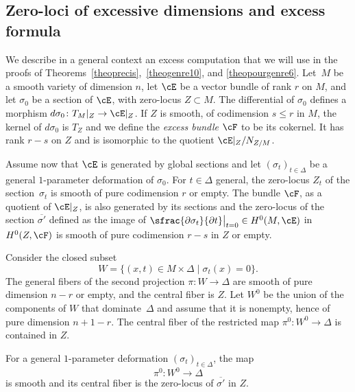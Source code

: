 \subsection{Zero-loci of excessive dimensions and excess formula}\label{secexcess}
We describe in a general context an excess computation that we will use in the
proofs of Theorems~\ref{theoprecis},~\ref{theogenre10}, and \ref{theopourgenre6}.
Let~$M$ be a smooth variety of dimension $n$, let $\cE$ be a vector bundle of rank $r$ on $M$, and let
$\sigma_0$ be a section of $\cE$, with zero-locus $Z\subset M$. The differential of $\sigma_0$ defines a morphism $d\sigma_0\colon T_M\vert_Z\to \cE\vert_{Z}$. If $Z$ is smooth, of codimension $s\le r $ in $M$,
the kernel of $d\sigma_0$ is $T_Z$ and we define the \emph{excess bundle $\cF$} to be its cokernel. It has rank $r-s$ on $Z$ and is isomorphic to the quotient $\cE\vert_{Z}/N_{Z/M}$.

Assume now that $\cE$ is generated by global sections and let $(\sigma_t)_{t\in \Delta}$ be a general $1$-parameter deformation of $\sigma_0$. For $t\in \Delta$ general, the zero-locus $Z_t$ of the section~$\sigma_t$ is smooth of pure codimension
$r$ {or empty}. The bundle $\cF$, as a quotient of $\cE\vert_Z$, is also generated by its sections and
the zero-locus of the section
$\overline {\sigma'} $ defined as the image of $\sfrac{\partial\sigma_t}{\partial t} \big\vert_{t=0}\in H^0(M,\cE)$ in
$H^0(Z,\cF)$ is smooth of pure codimension $r-s$ in $Z$ {or empty}.

Consider the closed subset
\begin{equation}\label{eqW}
W=\{(x,t)\in M\times \Delta\mid \sigma_t(x)=0\}.
\end{equation}
The general fibers of the second projection $\pi\colon W\to \Delta$ are smooth of pure dimension
$n-r$ {or empty,} and the central fiber is $Z$. {Let $W^0$ be the union of the components of $W$ that dominate~$\Delta$ and assume that it is nonempty, hence of pure dimension
$n+1-r$}. The central fiber of the restricted map $\pi^0\colon W^0\to \Delta$ is contained in $Z$.

\begin{prop}\label{proexcess}
For a general $1$-parameter deformation $(\sigma_t)_{t\in \Delta}$, the map
\[
\pi^0\colon W^0\to \Delta
\]
is smooth and its central fiber is the zero-locus of $\overline {\sigma'} $ in $Z$.
\end{prop}

